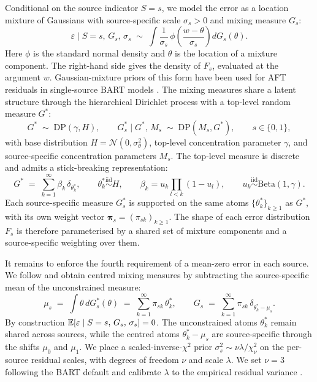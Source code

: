 Conditional on the source indicator $S = s$, we model the error as a location mixture of Gaussians with source-specific scale $\sigma_s > 0$ and mixing measure $G_s$:
\begin{equation}
\varepsilon \mid S = s,\, G_s,\, \sigma_s \;\sim\; \int \frac{1}{\sigma_s}\, \phi\!\left(\frac{w - \theta}{\sigma_s}\right) dG_s(\theta).
\label{eq:hdp-fs}
\end{equation}
Here $\phi$ is the standard normal density and $\theta$ is the location of a mixture component.
The right-hand side gives the density of $F_s$, evaluated at the argument $w$.
Gaussian-mixture priors of this form have been used for AFT residuals in single-source BART models \citep{henderson2020individualized}.
The mixing measures share a latent structure through the hierarchical Dirichlet process \citep{teh2006hierarchical} with a top-level random measure $G^*$:
\begin{equation}
G^* \;\sim\; \mathrm{DP}(\gamma, H), \qquad G_s^* \mid G^*,\, M_s \;\sim\; \mathrm{DP}(M_s, G^*), \qquad s \in \{0, 1\},
\label{eq:hdp-prior}
\end{equation}
with base distribution $H = \mathcal{N}(0, \sigma_\theta^2)$, top-level concentration parameter $\gamma$, and source-specific concentration parameters $M_s$.
The top-level measure is discrete and admits a stick-breaking representation:
\begin{equation}
G^* \;=\; \sum_{k=1}^\infty \beta_k\, \delta_{\theta_k^*}, \qquad \theta_k^* \stackrel{\mathrm{iid}}{\sim} H, \qquad \beta_k = u_k \prod_{l < k}(1 - u_l), \qquad u_k \stackrel{\mathrm{iid}}{\sim} \mathrm{Beta}(1, \gamma).
\label{eq:hdp-stick}
\end{equation}
Each source-specific measure $G_s^*$ is supported on the same atoms $\{\theta_k^*\}_{k\geq 1}$ as $G^*$, with its own weight vector $\bm{\pi}_s = (\pi_{sk})_{k \ge 1}$.
The shape of each error distribution $F_s$ is therefore parameterised by a shared set of mixture components and a source-specific weighting over them.

It remains to enforce the fourth requirement of a mean-zero error in each source.
We follow \citet{yang2010semiparametric} and obtain centred mixing measures by subtracting the source-specific mean of the unconstrained measure:
\begin{equation}
\mu_s \;=\; \int \theta\, dG_s^*(\theta) \;=\; \sum_{k=1}^\infty \pi_{sk}\, \theta_k^*, \qquad G_s \;=\; \sum_{k=1}^\infty \pi_{sk}\, \delta_{\theta_k^* - \mu_s}.
\label{eq:hdp-centring}
\end{equation}
By construction $\mathbb{E}[\varepsilon \mid S = s,\, G_s,\, \sigma_s] = 0$.
The unconstrained atoms $\theta_k^*$ remain shared across sources, while the centred atoms $\theta_k^* - \mu_s$ are source-specific through the shifts $\mu_0$ and $\mu_1$.
We place a scaled-inverse-$\chi^2$ prior $\sigma_s^2 \sim \nu\lambda / \chi^2_\nu$ on the per-source residual scales, with degrees of freedom $\nu$ and scale $\lambda$.
We set $\nu = 3$ following the BART default and calibrate $\lambda$ to the empirical residual variance \citep{chipman2010bart}.

